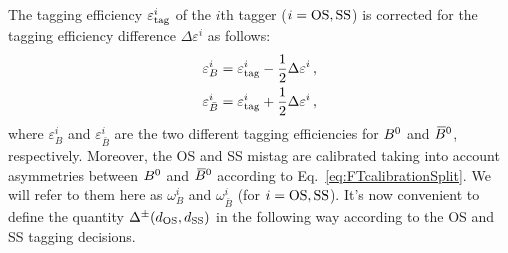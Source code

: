 The tagging efficiency $\varepsilon_{\rm tag}^{i}$ of the $i$th tagger ($i=\rm OS,\rm SS$) is corrected for the tagging efficiency difference $\Delta\varepsilon^{i}$ as follows:
\begin{align}
        \varepsilon_{B}^{i} &= \varepsilon_{\rm tag}^{i} - \frac{1}{2} \Delta\varepsilon^{i}\,, \\
        \varepsilon_{\bar B}^{i} &= \varepsilon_{\rm tag}^{i} + \frac{1}{2} \Delta\varepsilon^{i}\,,
\end{align} 
where $\varepsilon_{B}^{i}$ and $\varepsilon_{\bar B}^{i}$ are the two different tagging efficiencies for $B^0$ and $\kern 0.18em\overline{\kern -0.18em B}{}^0$, respectively. Moreover, the OS and SS mistag are calibrated taking into account asymmetries between $B^0$ and $\kern 0.18em\overline{\kern -0.18em B}{}^0$ according to Eq.~\ref{eq:FTcalibrationSplit}. We will refer to them here as $\omega_{B}^{i}$ and $\omega_{\bar B}^{i}$ (for $i=\rm OS,\rm SS$).
It's now convenient to define the quantity $\Delta^{\pm}(d_{\rm OS}, d_{\rm SS})$ in the following way according to the OS and SS tagging decisions.
